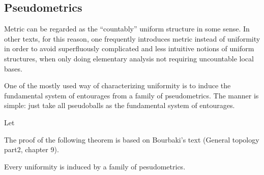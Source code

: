 \subsection{Pseudometrics}




Metric can be regarded as the ``countably'' uniform structure in some sense. 
In other texts, for this reason, one frequently introduces metric instead of uniformity in order to avoid superfluously complicated and less intuitive notions of uniform structures, when only doing elementary analysis not requiring uncountable local bases.



One of the mostly used way of characterizing uniformity is to induce the fundamental system of entourages from a family of pseudometrics.
The manner is simple: just take all pseudoballs as the fundamental system of entourages.
\begin{defn}
Let 
\end{defn}
The proof of the following theorem is based on Bourbaki's text (General topology part2, chapter 9).

\begin{thm}
Every uniformity is induced by a family of pesudometrics.
\end{thm}
\begin{pf}

\end{pf}











